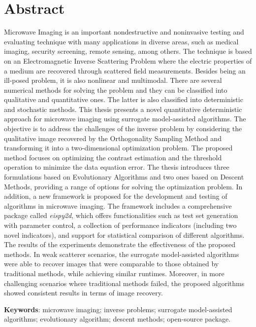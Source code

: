 \chapter*{Abstract}

	\noindent Microwave Imaging is an important nondestructive and noninvasive testing and evaluating technique with many applications in diverse areas, such as medical imaging, security screening, remote sensing, among others. The technique is based on an Electromagnetic Inverse Scattering Problem where the electric properties of a medium are recovered through scattered field measurements. Besides being an ill-posed problem, it is also nonlinear and multimodal. There are several numerical methods for solving the problem and they can be classified into qualitative and quantitative ones. The latter is also classified into deterministic and stochastic methods. This thesis presents a novel quantitative deterministic approach for microwave imaging using surrogate model-assisted algorithms. The objective is to address the challenges of the inverse problem by considering the qualitative image recovered by the Orthogonality Sampling Method and transforming it into a two-dimensional optimization problem. The proposed method focuses on optimizing the contrast estimation and the threshold operation to minimize the data equation error. The thesis introduces three formulations based on Evolutionary Algorithms and two ones based on Descent Methods, providing a range of options for solving the optimization problem. In addition, a new framework is proposed for the development and testing of algorithms in microwave imaging. The framework includes a comprehensive package called \textit{eispy2d}, which offers functionalities such as test set generation with parameter control, a collection of performance indicators (including two novel indicators), and support for statistical comparison of different algorithms. The results of the experiments demonstrate the effectiveness of the proposed methods. In weak scatterer scenarios, the surrogate model-assisted algorithms were able to recover images that were comparable to those obtained by traditional methods, while achieving similar runtimes. Moreover, in more challenging scenarios where traditional methods failed, the proposed algorithms showed consistent results in terms of image recovery.
	
	\vspace{5mm}
	
	\noindent\textbf{Keywords}: microwave imaging; inverse problems; surrogate model-assisted algorithms; evolutionary algorithm; descent methods; open-source package.
	
	\thispagestyle{empty}
	